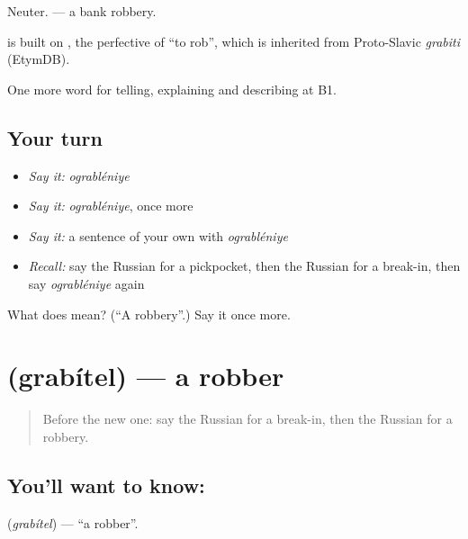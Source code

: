 Neuter. \emph{ } — a bank robbery.

\begin{cousinweb}
\emph{} is built on \emph{}, the perfective of \emph{} \textquotedblleft{}to rob\textquotedblright{}, which is inherited from Proto-Slavic \emph{grabiti} (EtymDB).
\end{cousinweb}

\begin{grammarlens}[title={What you've built}]
One more word for telling, explaining and describing at B1.
\end{grammarlens}

\subsection*{Your turn}
\begin{itemize}
\raggedright
  \item \emph{Say it:} \emph{ograbléniye}
  \item \emph{Say it:} \emph{ograbléniye}, once more
  \item \emph{Say it:} a sentence of your own with \emph{ograbléniye}
  \item \emph{Recall:} say the Russian for a pickpocket, then the Russian for a break-in, then say \emph{ograbléniye} again
\end{itemize}

\begin{tcolorbox}[breakable,colback=teal!4,colframe=teal!35!black,title={Before you move on}]
What does  mean? (\textquotedblleft{}A robbery\textquotedblright{}.) Say it once more.
\end{tcolorbox}
\section[\texorpdfstring{\ru{грабитель} (grabítel)}{грабитель (grabítel)}]{ (grabítel) — a robber}

\label{lesson:RU-C289-grabitel}



\begin{quote}
Before the new one: say the Russian for a break-in, then the Russian for a robbery.
\end{quote}

\subsection*{You'll want to know: }
\textbf{} (\emph{grabítel}) — \textquotedblleft{}a robber\textquotedblright{}.


